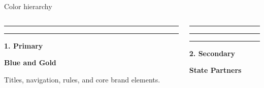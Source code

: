 \newcommand{\wvuguidepalettebar}[2]{%
  \begingroup
  \setlength{\fboxsep}{0pt}%
  \colorbox{#1}{\rule{0pt}{#2}\rule{\linewidth}{0pt}}%
  \endgroup
}
\newcommand{\wvuguideswatch}[3]{%
  \begingroup
  \setlength{\fboxsep}{0pt}%
  \fcolorbox{wvu-coopers-gray}{#1}{\rule{0pt}{.34cm}%
    \rule{\dimexpr\linewidth-2\fboxrule\relax}{0pt}}\par
  \vspace{.04cm}
  {\small\bfseries #2\par}
  {\footnotesize #3\par}
  \vspace{.23cm}
  \endgroup
}

\begin{frame}{Color hierarchy}
  \begin{columns}[T,onlytextwidth]
    \begin{column}{.32\textwidth}
      \begin{minipage}[t][1.10cm][t]{\linewidth}
        \wvuguidepalettebar{wvu-blue}{.58cm}\par
        \wvuguidepalettebar{wvu-gold}{.22cm}\par
      \end{minipage}\par
      \vspace{.12cm}
      {\large\bfseries\color{wvu-blue}1. Primary\par}
      \smallskip
      {\bfseries Blue and Gold\par}
      \smallskip
      \small Titles, navigation, rules, and core brand elements.
    \end{column}
    \begin{column}{.29\textwidth}
      \begin{minipage}[t][1.10cm][t]{\linewidth}
        \wvuguidepalettebar{wvu-safety-blue}{.20cm}\par
        \wvuguidepalettebar{wvu-hemlock}{.20cm}\par
        \wvuguidepalettebar{wvu-wild-flour}{.20cm}\par
      \end{minipage}\par
      \vspace{.12cm}
      {\large\bfseries\color{wvu-blue}2. Secondary\par}
      \smallskip
      {\bfseries State Partners\par}

\end{column}
\end{columns}
\end{frame}
